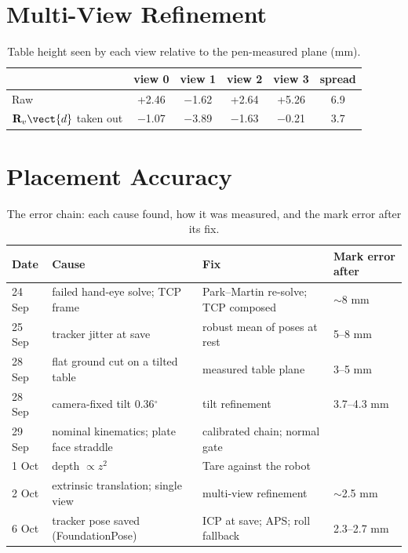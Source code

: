 \section{Multi-View Refinement}
\label{sec:exp_multiview}
\begin{table}[htbp]
\caption{Table height seen by each view relative to the pen-measured plane (mm).}
\label{tab:exp_table_views}
\centering
\begin{tabular}{@{}lccccc@{}}
\toprule
 & view 0 & view 1 & view 2 & view 3 & spread \\
\midrule
Raw & +2.46 & $-$1.62 & +2.64 & +5.26 & 6.9 \\
$\mathbf{R}_v\vect{d}$ taken out & $-$1.07 & $-$3.89 & $-$1.63 & $-$0.21 & 3.7 \\
\bottomrule
\end{tabular}
\end{table}

\section{Placement Accuracy}
\label{sec:exp_placement}
\begin{table}[htbp]
\caption{The error chain: each cause found, how it was measured, and the mark error after
its fix.}
\label{tab:exp_error_chain}
\centering\small
\begin{tabular}{@{}llll@{}}
\toprule
Date & Cause & Fix & Mark error after \\
\midrule
24 Sep & failed hand-eye solve; TCP frame & Park--Martin re-solve; TCP composed & $\sim$8 mm \\
25 Sep & tracker jitter at save & robust mean of poses at rest & 5--8 mm \\
28 Sep & flat ground cut on a tilted table & measured table plane & 3--5 mm \\
28 Sep & camera-fixed tilt 0.36$^\circ$ & tilt refinement & 3.7--4.3 mm \\
29 Sep & nominal kinematics; plate face straddle & calibrated chain; normal gate & \\
1 Oct & depth $\propto z^2$ & Tare against the robot & \\
2 Oct & extrinsic translation; single view & multi-view refinement & $\sim$2.5 mm \\
6 Oct & tracker pose saved (FoundationPose) & ICP at save; APS; roll fallback & 2.3--2.7 mm \\
\bottomrule
\end{tabular}
\end{table}


